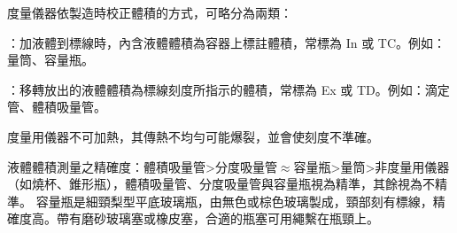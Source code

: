 \documentclass[a4paper,12pt]{article}
\begin{document}
\item 度量儀器依製造時校正體積的方式，可略分為兩類：
\bit
\item {}：加液體到標線時，內含液體體積為容器上標註體積，常標為 In 或 TC。例如：量筒、容量瓶。
\item {}：移轉放出的液體體積為標線刻度所指示的體積，常標為 Ex 或 TD。例如：滴定管、體積吸量管。
\eit
\item 度量用儀器不可加熱，其傳熱不均勻可能爆裂，並會使刻度不準確。
\item 液體體積測量之精確度：體積吸量管>分度吸量管$\approx$容量瓶>量筒>非度量用儀器（如燒杯、錐形瓶），體積吸量管、分度吸量管與容量瓶視為精準，其餘視為不精準。
\eit
{}
容量瓶是細頸梨型平底玻璃瓶，由無色或棕色玻璃製成，頸部刻有標線，精確度高。帶有磨砂玻璃塞或橡皮塞，合適的瓶塞可用繩繫在瓶頸上。
\end{document}
